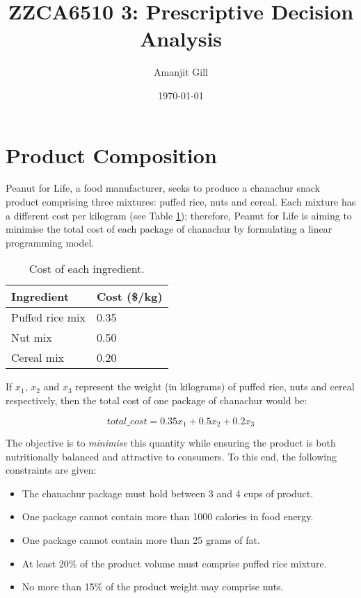 \documentclass[11pt, a4paper]{article}
\title{\LARGE\bfseries ZZCA6510 3: Prescriptive Decision Analysis}
\author{\Large Amanjit Gill}
\date{\normalsize \today}
\begin{document}
    
    \maketitle

    \thispagestyle{empty}

    \newpage

    \addtocounter{page}{-1}

    \section{Product Composition}

    Peanut for Life, a food manufacturer, seeks to produce a chanachur snack product comprising three mixtures: puffed rice, nuts and cereal. Each mixture has a different cost per kilogram (see Table \ref{costs}); therefore, Peanut for Life is aiming to minimise the total cost of each package of chanachur by formulating a linear programming model. 
    
    \begin{table}[!ht]
        \centering
        \caption{Cost of each ingredient.}
        \begin{tabular}{|l|l|}
            \hline
            Ingredient & Cost (\$/kg) \\ \hline
            Puffed rice mix & 0.35 \\ \hline
            Nut mix & 0.50 \\ \hline
            Cereal mix & 0.20 \\ \hline          
        \end{tabular}
        \label{costs}
    \end{table}
    
    
    If $x_{1}$, $x_{2}$ and $x_{3}$ represent the weight (in kilograms) of puffed rice, nuts and cereal respectively, then the total cost of one package of chanachur would be:

    \begin{equation}
        total\_cost = 0.35x_1 + 0.5x_2 + 0.2x_3
        \label{obj_func1}
    \end{equation}
    
    The objective is to \textit{minimise} this quantity while ensuring the product is both nutritionally balanced and attractive to consumers. To this end, the following constraints are given:

    \begin{itemize}
        \item The chanachur package must hold between 3 and 4 cups of product.
        \item One package cannot contain more than 1000 calories in food energy.
        \item One package cannot contain more than 25 grams of fat.
        \item At least 20\% of the product volume must comprise puffed rice mixture.
        \item No more than 15\% of the product weight may comprise nuts.
    \end{itemize}
\end{document}

